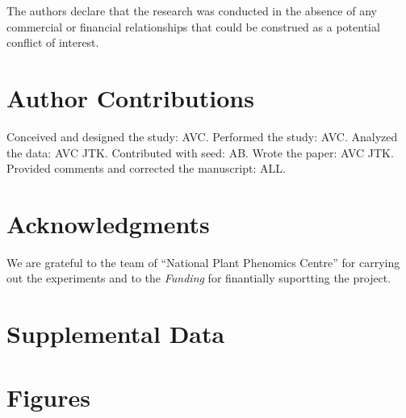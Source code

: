 \documentclass{frontiersSCNS} %
\begin{document}
The authors declare that the research was conducted in the absence of any commercial or financial relationships that could be construed as a potential conflict of interest.

\section*{Author Contributions}

Conceived and designed the study: AVC. Performed the study: AVC. Analyzed the data: AVC JTK. Contributed with seed: AB. Wrote the paper: AVC JTK. Provided comments and corrected the manuscript: ALL.

\section*{Acknowledgments}
 We are grateful to the team of “National Plant Phenomics Centre” for carrying out the experiments and to the 
\textit{Funding\textcolon} for finantially suportting the project.

\section*{Supplemental Data}





\section*{Figures}

\end{document}
